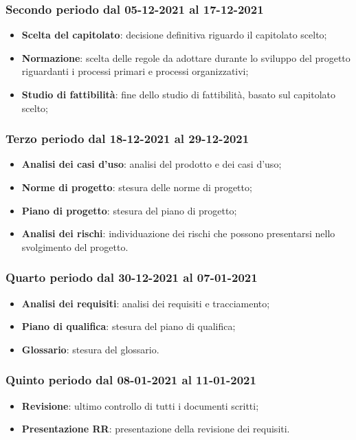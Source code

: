 \documentclass[]{article}
\begin{document}
	\subsubsection{Secondo periodo dal 05-12-2021 al 17-12-2021}
	\begin{itemize}
	\item \textbf{Scelta del capitolato}: decisione definitiva riguardo il capitolato scelto;
	\item \textbf{Normazione}: scelta delle regole da adottare durante lo sviluppo del progetto riguardanti i
	processi primari e processi organizzativi;
	\item \textbf{Studio di fattibilità}: fine dello studio di fattibilità, basato sul capitolato scelto;
	\end{itemize}
	
	\subsubsection{Terzo periodo dal 18-12-2021 al 29-12-2021}
	\begin{itemize}
		\item \textbf{Analisi dei casi d'uso}: analisi del prodotto e dei casi d’uso;
		\item \textbf{Norme di progetto}: stesura delle norme di progetto;
		\item \textbf{Piano di progetto}: stesura del piano di progetto;
		\item \textbf{Analisi dei rischi}: individuazione dei rischi che possono presentarsi nello svolgimento del
		progetto.
	\end{itemize}
	
	\subsubsection{Quarto periodo dal 30-12-2021 al 07-01-2021}
	\begin{itemize}
	\item \textbf{Analisi dei requisiti}: analisi dei requisiti e tracciamento;
	\item \textbf{Piano di qualifica}: stesura del piano di qualifica;
	\item \textbf{Glossario}: stesura del glossario.
	\end{itemize}
	
	\subsubsection{Quinto periodo dal 08-01-2021 al 11-01-2021}
	\begin{itemize}
	\item \textbf{Revisione}: ultimo controllo di tutti i documenti scritti;
	\item \textbf{Presentazione RR}: presentazione della revisione dei requisiti.
	\end{itemize}
	
\end{document}
